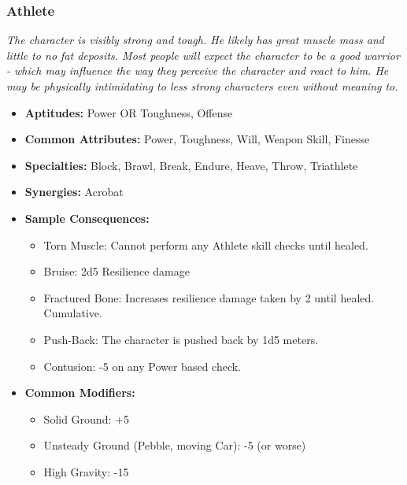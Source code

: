\subsubsection{Athlete}\label{Athlete}
\textit{The character is visibly strong and tough.
He likely has great muscle mass and little to no fat deposits.
Most people will expect the character to be a good warrior - which may influence the way they perceive the character and react to him.
He may be physically intimidating to less strong characters even without meaning to.}
\begin{itemize}
	\item \textbf{Aptitudes:} Power OR Toughness, Offense
	\item \textbf{Common Attributes:} Power, Toughness, Will, Weapon Skill, Finesse
	\item \textbf{Specialties:} Block, Brawl, Break, Endure, Heave, Throw, Triathlete
	\item \textbf{Synergies:} Acrobat
	\item \textbf{Sample Consequences:} 
	\begin{itemize}
		\item Torn Muscle: Cannot perform any Athlete skill checks until healed.
		\item Bruise: 2d5 Resilience damage
		\item Fractured Bone: Increases resilience damage taken by 2 until healed. Cumulative.
		\item Push-Back: The character is pushed back by 1d5 meters.
		\item Contusion: -5 on any Power based check.
	\end{itemize}
	\item \textbf{Common Modifiers:}
	\begin{itemize}
		\item Solid Ground: +5
		\item Unsteady Ground (Pebble, moving Car): -5 (or worse)
		\item High Gravity: -15
	\end{itemize}
\end{itemize}


